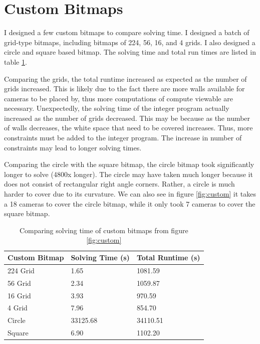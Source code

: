 \documentclass[11pt]{article}
\begin{document}
\section{Custom Bitmaps}
I designed a few custom bitmaps to compare solving time. I designed a batch of grid-type bitmaps, including bitmaps of 224, 56, 16, and 4 grids. I also designed a circle and square based bitmap. The solving time and total run times are listed in table \ref{table:solvetime}.

Comparing the grids, the total runtime increased as expected as the number of grids increased. This is likely due to the fact there are more walls available for cameras to be placed by, thus more computations of compute viewable are necessary. Unexpectedly, the solving time of the integer program actually increased as the number of grids decreased. This may be because as the number of walls decreases, the white space that need to be covered increases. Thus, more constraints must be added to the integer program. The increase in number of constraints may lead to longer solving times.

Comparing the circle with the square bitmap, the circle bitmap took significantly longer to solve (4800x longer). The circle may have taken much longer because it does not consist of rectangular right angle corners. Rather, a circle is much harder to cover due to its curvature. We can also see in figure \ref{fig:custom} it takes a 18 cameras to cover the circle bitmap, while it only took 7 cameras to cover the square bitmap.

\begin{table}[H]
\centering
\begin{tabular}{|l|l|l|}
\hline
Custom Bitmap & Solving Time (s)& Total Runtime (s)\\ \hline
224 Grid & 1.65 & 1081.59\\ \hline
56 Grid & 2.34 & 1059.87\\ \hline
16 Grid & 3.93 & 970.59\\ \hline
4 Grid & 7.96 & 854.70\\ \hline
Circle & 33125.68 & 34110.51\\ \hline
Square & 6.90 & 1102.20\\ \hline
\end{tabular}
\caption{\label{table:solvetime} Comparing solving time of custom bitmaps from figure \ref{fig:custom}}
\end{table}
\end{document}
